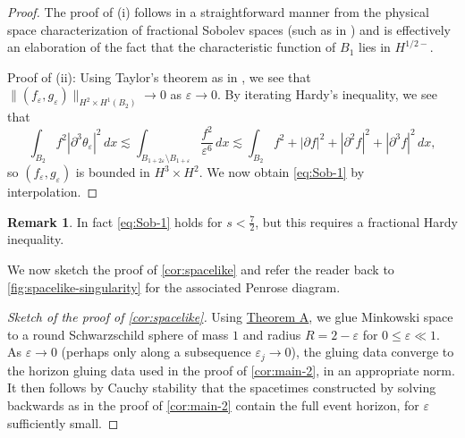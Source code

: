 \documentclass[10pt]{article}
\numberwithin{equation}{section}
\theoremstyle{plain}
\theoremstyle{definition}
\newtheorem{rk}{Remark}[section]
\newcommand{\ve}{\varepsilon}
\newcommand{\les}{\lesssim}
\begin{document}
\begin{proof}
The proof of (i) follows in a straightforward manner from the physical space characterization of fractional Sobolev spaces (such as in \cite{hitchhiker}) and is effectively an elaboration of the fact that the characteristic function of $B_1$ lies in $H^{1/2-}$. 

Proof of (ii): Using Taylor's theorem as in \cite[Lemma 5.1]{KU22}, we see that $\|(f_\ve,g_\ve)\|_{H^2\times H^1(B_2)}\to 0$ as $\ve\to 0$. By iterating Hardy's inequality, we see that 
    \begin{equation*}
        \int_{B_2}f^2 |\partial^3\theta_\ve|^2\,dx\les \int_{B_{1+2\ve}\setminus B_{1+\ve}} \frac{f^2}{\ve^6}\,dx \les
        \int_{B_2} f^2+|\partial f|^2 +|\partial^2 f|^2+|\partial^3 f|^2\,dx,
    \end{equation*}
    so $(f_\ve,g_\ve)$ is bounded in $H^3\times H^2$. We now obtain \eqref{eq:Sob-1} by interpolation. 
\end{proof}
\begin{rk}
    In fact \eqref{eq:Sob-1} holds for $s<\frac 72$, but this requires a fractional Hardy inequality. 
\end{rk}

We now sketch the proof of \cref{cor:spacelike} and refer the reader back to \cref{fig:spacelike-singularity} for the associated Penrose diagram.

\begin{proof}[Sketch of the proof of \cref{cor:spacelike}]
Using \hyperlink{thmA}{Theorem A}, we glue Minkowski space to a round Schwarzschild sphere of mass $1$ and radius $R=2-\ve$ for $0\le\ve\ll 1$. As $\ve\to 0$ (perhaps only along a subsequence $\ve_j\to 0$), the gluing data converge to the horizon gluing data used in the proof of \cref{cor:main-2}, in an appropriate norm. It then follows by Cauchy stability that the spacetimes constructed by solving backwards as in the proof of \cref{cor:main-2} contain the full event horizon, for $\ve$ sufficiently small. 
\end{proof}
\end{document}
